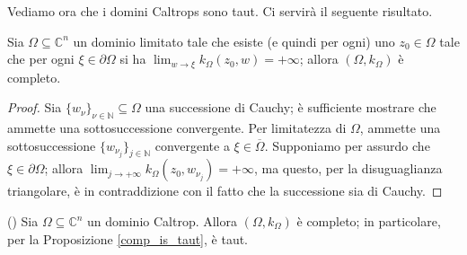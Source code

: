 Vediamo ora che i domini Caltrops sono taut. Ci servirà il seguente risultato.

\begin{lm} \label{ainftyecompl}
    Sia $\Omega\subseteq\mathbb{C}^n$ un dominio limitato tale che esiste (e quindi per ogni) uno $z_0\in\Omega$ tale che per ogni $\xi\in\partial\Omega$ si ha $\displaystyle\lim_{w\longrightarrow\xi}k_\Omega(z_0,w)=+\infty$; allora $(\Omega,k_\Omega)$ è completo.
\end{lm}

\begin{proof}
    Sia $\{w_\nu\}_{\nu\in\mathbb{N}}\subseteq\Omega$ una successione di Cauchy; è sufficiente mostrare che ammette una sottosuccessione convergente. Per limitatezza di $\Omega$, ammette una sottosuccessione $\{w_{\nu_j}\}_{j\in\mathbb{N}}$ convergente a $\xi\in\overline{\Omega}$. Supponiamo per assurdo che $\xi\in\partial\Omega$; allora $\displaystyle\lim_{j\longrightarrow+\infty}k_\Omega(z_0,w_{\nu_j})=+\infty$, ma questo, per la disuguaglianza triangolare, è in contraddizione con il fatto che la successione sia di Cauchy.
\end{proof}

\begin{thm}
    (\cite[Theorem 8.2]{BM}) Sia $\Omega\subseteq\mathbb{C}^n$ un dominio Caltrop. Allora $(\Omega,k_\Omega)$ è completo; in particolare, per la Proposizione \ref{comp_is_taut}, è taut.
\end{thm}

